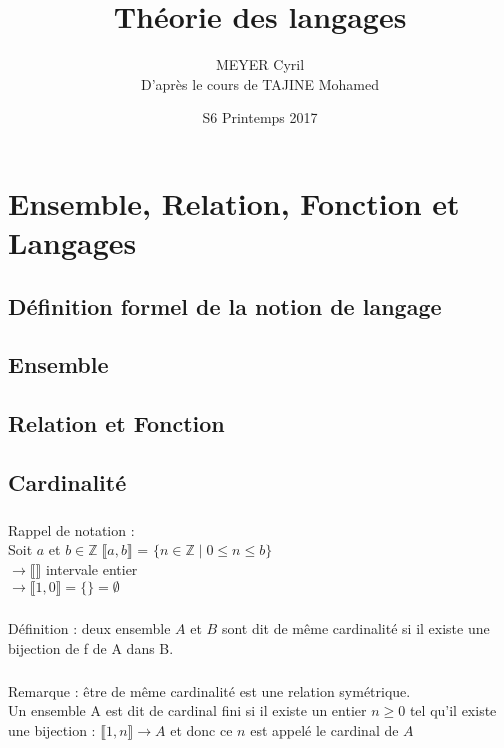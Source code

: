 \documentclass[12pt]{report}
\title{Théorie des langages}
\date{S6 Printemps 2017}
\author{MEYER Cyril\\D'après le cours de TAJINE Mohamed}
\begin{document}

\maketitle
\newpage
\tableofcontents
\newpage

\chapter{Ensemble, Relation, Fonction et Langages}

\section{Définition formel de la notion de langage}
	
\section{Ensemble}
	
\section{Relation et Fonction}
	
\section{Cardinalité}
	
\paragraph{}
Rappel de notation :\\
Soit $a$ et $b \in \mathbb{Z}\;\llbracket a,b \rrbracket$ = $\{n \in \mathbb{Z}\;|\; 0\leq n\leq b\}$\\
$\to \llbracket \rrbracket$ intervale entier\\
$\to \llbracket 1,0 \rrbracket = \{\} = \emptyset$\\
\paragraph{}
Définition : deux ensemble $A$ et $B$ sont dit de même cardinalité si il existe une bijection de f de A dans B.
\paragraph{}
Remarque : être de même cardinalité est une relation symétrique.\\
Un ensemble A est dit de cardinal fini si il existe un entier $n \geq 0$ tel qu'il existe une bijection : $\llbracket 1,n \rrbracket \to A$ et donc ce $n$ est appelé le cardinal de $A$
\end{document}
